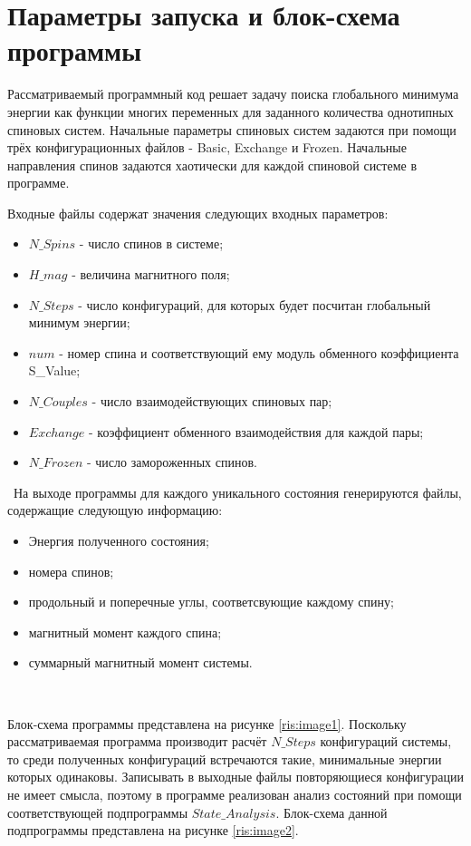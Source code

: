 \documentclass[14pt,a4paper,report]{ncc}
\begin{document}
\section{Параметры запуска и блок-схема программы}

Рассматриваемый программный код решает задачу поиска глобального минимума энергии как функции многих переменных для заданного количества однотипных спиновых систем. Начальные параметры спиновых систем задаются при помощи трёх конфигурационных файлов - Basic, Exchange и Frozen. Начальные направления спинов задаются хаотически для каждой спиновой системе в программе.
\

Входные файлы содержат значения следующих входных параметров:
\begin{itemize}
\item $N\_Spins$ - число спинов в системе;
\item $H\_mag$ - величина магнитного поля;
\item $N\_Steps$ - число конфигураций, для которых будет посчитан глобальный минимум энергии;
\item $num$ - номер спина и соответствующий ему модуль обменного коэффициента S\_Value;
\item $N\_Couples$ - число взаимодействующих спиновых пар;
\item $Exchange$ - коэффициент обменного взаимодействия для каждой пары;
\item $N\_Frozen$ - число замороженных спинов.
\end{itemize}
\ 
На выходе программы для каждого уникального состояния генерируются файлы, содержащие следующую информацию:
\

\begin{itemize}
\item Энергия полученного состояния;
\item номера спинов; 
\item продольный и поперечные углы, соответсвующие каждому спину;
\item магнитный момент каждого спина;
\item суммарный магнитный момент системы.
\end{itemize}
\

Блок-схема программы представлена на рисунке \ref{ris:image1}.
Поскольку рассматриваемая программа производит расчёт $N\_Steps$ конфигураций системы, то среди полученных конфигураций встречаются такие, минимальные энергии которых одинаковы. Записывать в выходные файлы повторяющиеся конфигурации не имеет смысла, поэтому в программе реализован анализ состояний при помощи соответствующей подпрограммы $State\_Analysis$. Блок-схема данной подпрограммы представлена на рисунке \ref{ris:image2}.
\end{document}
